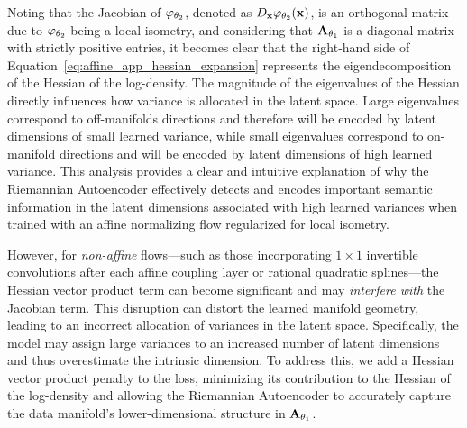 Noting that the Jacobian of \(\varphi_{\theta_2}\), denoted as \( D_{\mathbf{x}} \varphi_{\theta_2}(\mathbf{x}) \), is an orthogonal matrix due to \(\varphi_{\theta_2}\) being a local isometry, and considering that \(\mathbf{A}_{\theta_1}\) is a diagonal matrix with strictly positive entries, it becomes clear that the right-hand side of Equation~\eqref{eq:affine_app_hessian_expansion} represents the eigendecomposition of the Hessian of the log-density. The magnitude of the eigenvalues of the Hessian directly influences how variance is allocated in the latent space. Large eigenvalues correspond to off-manifolds directions and therefore will be encoded by latent dimensions of small learned variance, while small eigenvalues correspond to on-manifold directions and will be encoded by latent dimensions of high learned variance. This analysis provides a clear and intuitive explanation of why the Riemannian Autoencoder effectively detects and encodes important semantic information in the latent dimensions associated with high learned variances when trained with an affine normalizing flow regularized for local isometry.

However, for \emph{non-affine} flows—such as those incorporating \(1 \times 1\) invertible convolutions after each affine coupling layer or rational quadratic splines—the Hessian vector product term can become significant and may \emph{interfere with} the Jacobian term. This disruption can distort the learned manifold geometry, leading to an incorrect allocation of variances in the latent space. Specifically, the model may assign large variances to an increased number of latent dimensions and thus overestimate the intrinsic dimension. To address this, we add a Hessian vector product penalty to the loss, minimizing its contribution to the Hessian of the log-density and allowing the Riemannian Autoencoder to accurately capture the data manifold’s lower-dimensional structure in \(\mathbf{A}_{\theta_1}\).


